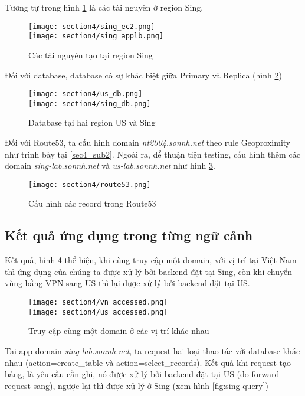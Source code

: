 Tương tự trong hình \ref{fig:sing-resources} là các tài nguyên ở region Sing.

\begin{figure}
    \centering
    \texttt{[image: section4/sing\_ec2.png]} \\
    \texttt{[image: section4/sing\_applb.png]}
    \caption{Các tài nguyên tạo tại region Sing}
    \label{fig:sing-resources}
\end{figure}

Đối với database, database có sự khác biệt giữa Primary và Replica (hình \ref{fig:database})

\begin{figure}
    \centering
    \texttt{[image: section4/us\_db.png]} \\
    \texttt{[image: section4/sing\_db.png]}
    \caption{Database tại hai region US và Sing}
    \label{fig:database}
\end{figure}


Đối với Route53, ta cấu hình domain \textit{nt2004.sonnh.net} theo rule Geoproximity như trình bày tại \ref{sec4_sub2}. Ngoài ra, để thuận tiện testing, cấu hình thêm các domain \textit{sing-lab.sonnh.net} và \textit{us-lab.sonnh.net} như hình \ref{fig:route53}.

\begin{figure}
    \centering
    \texttt{[image: section4/route53.png]}
    \caption{Cấu hình các record trong Route53}
    \label{fig:route53}
\end{figure}

\subsection{Kết quả ứng dụng trong từng ngữ cảnh}

Kết quả, hình \ref{fig:cross_region_access} thể hiện, khi cùng truy cập một domain, với vị trí tại Việt Nam thì ứng dụng của chúng ta được xử lý bởi backend đặt tại Sing, còn khi chuyển vùng bằng VPN sang US thì lại được xử lý bởi backend đặt tại US.

\begin{figure}
    \centering
    \texttt{[image: section4/vn\_accessed.png]} \\
    \texttt{[image: section4/us\_accessed.png]}
    \caption{Truy cập cùng một domain ở các vị trí khác nhau}
    \label{fig:cross_region_access}
\end{figure}

Tại app domain \textit{sing-lab.sonnh.net}, ta request hai loại thao tác với database khác nhau (action=create\_table và action=select\_records). Kết quả khi request tạo bảng, là yêu cầu cần ghi, nó được xử lý bởi backend đặt tại US (do forward request sang), ngược lại thì được xử lý ở Sing (xem hình \ref{fig:sing-query})


